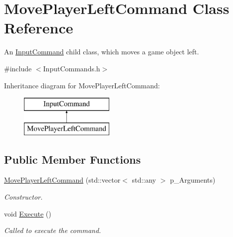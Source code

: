 \hypertarget{class_move_player_left_command}{}\section{Move\+Player\+Left\+Command Class Reference}
\label{class_move_player_left_command}


An \mbox{\hyperlink{class_input_command}{Input\+Command}} child class, which moves a game object left.  




{\ttfamily \#include $<$Input\+Commands.\+h$>$}

Inheritance diagram for Move\+Player\+Left\+Command\+:\begin{figure}[H]
\begin{center}
\leavevmode
\includegraphics[height=2.000000cm]{class_move_player_left_command}
\end{center}
\end{figure}
\subsection*{Public Member Functions}
\begin{DoxyCompactItemize}
\item 
\mbox{\hyperlink{class_move_player_left_command_abe4089d4fb0c385f39b7b96a52178c59}{Move\+Player\+Left\+Command}} (std\+::vector$<$ std\+::any $>$ p\+\_\+\+Arguments)
\begin{DoxyCompactList}\small\item\em Constructor. \end{DoxyCompactList}\item 
\mbox{\label{class_move_player_left_command_a9984df3cd892b7dbc29498d593e3400d}} 
void \mbox{\hyperlink{class_move_player_left_command_a9984df3cd892b7dbc29498d593e3400d}{Execute}} ()
\begin{DoxyCompactList}\small\item\em Called to execute the command. \end{DoxyCompactList}\end{DoxyCompactItemize}
